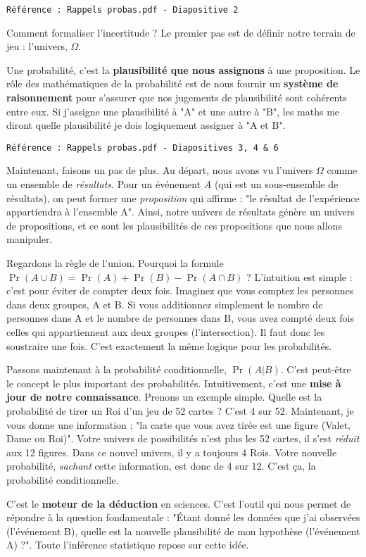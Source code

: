 \documentclass[12pt, a4paper]{article}
\newcommand{\slidenote}[1]{%
    \par\vspace{1.5ex}%
    \noindent\texttt{\small\color{gray}#1}\par\nopagebreak\vspace{1.5ex}%
}
\begin{document}
\slidenote{Référence : Rappels probas.pdf - Diapositive 2}
Comment formaliser l'incertitude ? Le premier pas est de définir notre terrain de jeu : l'univers, $\Omega$.

Une probabilité, c'est la \textbf{plausibilité que nous assignons} à une proposition. Le rôle des mathématiques de la probabilité est de nous fournir un \textbf{système de raisonnement} pour s'assurer que nos jugements de plausibilité sont cohérents entre eux. Si j'assigne une plausibilité à "A" et une autre à "B", les maths me diront quelle plausibilité je dois logiquement assigner à "A et B".

\slidenote{Référence : Rappels probas.pdf - Diapositives 3, 4 \& 6}
Maintenant, faisons un pas de plus. Au départ, nous avons vu l'univers $\Omega$ comme un ensemble de \textit{résultats}. Pour un événement $A$ (qui est un sous-ensemble de résultats), on peut former une \textit{proposition} qui affirme : "le résultat de l'expérience appartiendra à l'ensemble A". Ainsi, notre univers de résultats génère un univers de propositions, et ce sont les plausibilités de ces propositions que nous allons manipuler.

Regardons la règle de l'union. Pourquoi la formule $\Pr(A \cup B) = \Pr(A) + \Pr(B) - \Pr(A \cap B)$ ? L'intuition est simple : c'est pour éviter de compter deux fois. Imaginez que vous comptez les personnes dans deux groupes, A et B. Si vous additionnez simplement le nombre de personnes dans A et le nombre de personnes dans B, vous avez compté deux fois celles qui appartiennent aux deux groupes (l'intersection). Il faut donc les soustraire une fois. C'est exactement la même logique pour les probabilités.

Passons maintenant à la probabilité conditionnelle, $\Pr(A|B)$. C'est peut-être le concept le plus important des probabilités. Intuitivement, c'est une \textbf{mise à jour de notre connaissance}.
Prenons un exemple simple. Quelle est la probabilité de tirer un Roi d'un jeu de 52 cartes ? C'est 4 sur 52.
Maintenant, je vous donne une information : "la carte que vous avez tirée est une figure (Valet, Dame ou Roi)". Votre univers de possibilités n'est plus les 52 cartes, il s'est \textit{réduit} aux 12 figures. Dans ce nouvel univers, il y a toujours 4 Rois. Votre nouvelle probabilité, \textit{sachant} cette information, est donc de 4 sur 12. C'est ça, la probabilité conditionnelle.

C'est le \textbf{moteur de la déduction} en sciences. C'est l'outil qui nous permet de répondre à la question fondamentale : "Étant donné les données que j'ai observées (l'événement B), quelle est la nouvelle plausibilité de mon hypothèse (l'événement A) ?". Toute l'inférence statistique repose sur cette idée.
\end{document}

